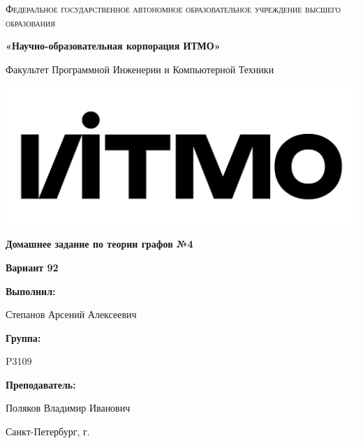 \documentclass[12pt,a4paper]{report}
\begin{document}
\begin{titlepage} 
	\centering
	{
        \scshape
        Федеральное государственное автономное образовательное учреждение высшего образования
        \par
        \textbf{«Научно-образовательная корпорация ИТМО»}
        \par
        \vspace*{1cm}
        Факультет Программной Инженерии и Компьютерной Техники
        \par
    }
    \vspace*{0.6cm}
    \includegraphics[width=\textwidth]{logo.png}
    {
        \Large
        \textbf{Домашнее задание по теории графов №4}
        \par
        \normalsize
        \vspace*{0.75cm}
        \textbf{Вариант 92}
        \par
    }
    \vfill
    \hfill\begin{minipage}{\dimexpr\textwidth-7.8cm}
        \textbf{Выполнил:}\par
        Степанов Арсений Алексеевич\par
        \vspace*{0.15cm}
        \textbf{Группа:}\par
        P3109\par
        \vspace*{0.15cm}
        \textbf{Преподаватель:}\par
        Поляков Владимир Иванович\par
    \end{minipage}
    \vfill
    Санкт-Петербург, \the\year{}г.
\end{titlepage}  
\onehalfspacing
\end{document}
